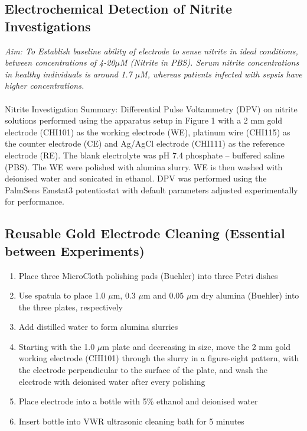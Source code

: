 \begin{appendices}
\subsection{Electrochemical Detection of Nitrite Investigations} 
\textit{Aim: To Establish baseline ability of electrode to sense nitrite in ideal conditions, between concentrations of 4-20$\mu$M (Nitrite in PBS). Serum nitrite concentrations in healthy individuals is around 1.7 $\mu$M, whereas patients infected with sepsis have higher concentrations.} \\\\
Nitrite Investigation Summary:
Differential Pulse Voltammetry (DPV) on nitrite solutions performed using the apparatus setup in Figure 1 with a 2 mm gold electrode (CHI101) as the working electrode (WE), platinum wire (CHI115) as the counter electrode (CE) and Ag/AgCl electrode (CHI111) as the reference electrode (RE). The blank electrolyte was pH 7.4 phosphate – buffered saline (PBS). The WE were polished with alumina slurry. WE is then washed with deionised water and sonicated in ethanol. DPV was performed using the PalmSens Emstat3 potentiostat with default parameters adjusted experimentally for performance.
\subsection{Reusable Gold Electrode Cleaning (Essential between Experiments)}
\begin{enumerate}
    \item Place three MicroCloth polishing pads (Buehler) into three Petri dishes
    \item Use spatula to place 1.0 $\mu$m, 0.3 $\mu$m and 0.05 $\mu$m dry alumina (Buehler) into the three plates, respectively
    \item Add distilled water to form alumina slurries
    \item Starting with the 1.0 $\mu$m plate and decreasing in size, move the 2 mm gold working electrode (CHI101) through the slurry in a figure-eight pattern, with the electrode perpendicular to the surface of the plate, and wash the electrode with deionised water after every polishing
    \item Place electrode into a bottle with 5\% ethanol and deionised water
    \item Insert bottle into VWR ultrasonic cleaning bath for 5 minutes
\end{enumerate}


\end{appendices}
